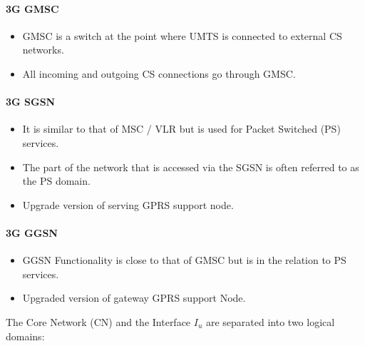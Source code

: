 \paragraph{3G GMSC}
\begin{itemize}
	\item GMSC is a switch at the point where UMTS is connected to external CS networks. 
	\item All incoming and outgoing CS connections go through GMSC.
\end{itemize}

\paragraph{3G SGSN}
\begin{itemize}
	\item It is similar to that of MSC / VLR but is used for Packet Switched (PS) services.
	\item The part of the network that is accessed via the SGSN is often referred to as	the PS domain. 
	\item Upgrade version of serving GPRS support node.
\end{itemize}

\paragraph{3G GGSN}
\begin{itemize}
	\item GGSN Functionality is close to that of GMSC but is in the relation to PS services.
	\item Upgraded version of gateway GPRS support Node. 
\end{itemize}

\noindent The Core Network (CN) and the Interface $ I_u $ are separated into two logical domains:

